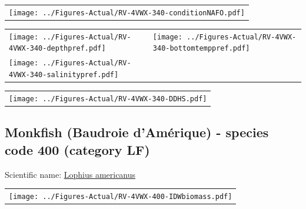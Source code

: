 \documentclass[12pt]{article}\usepackage[]{graphicx}\usepackage[]{color}
\begin{document}
\vspace{1cm}
\begin{minipage}{1.0\textwidth}
 \begin{tabular}{c}
\texttt{[image: ../Figures-Actual/RV-4VWX-340-conditionNAFO.pdf]} \\ 
\end{tabular} 
\end{minipage}
\clearpage
\begin{minipage}{1.0\textwidth}
 \begin{tabular}[t]{m{3in}m{3in}}
\texttt{[image: ../Figures-Actual/RV-4VWX-340-depthpref.pdf]} & 
\texttt{[image: ../Figures-Actual/RV-4VWX-340-bottomtemppref.pdf]} \\ 
\texttt{[image: ../Figures-Actual/RV-4VWX-340-salinitypref.pdf]} & 
 \\ 
\end{tabular} 
\end{minipage}
\newline

\vspace{1cm}
\begin{minipage}{1.0\textwidth}
 \begin{tabular}{c}
\texttt{[image: ../Figures-Actual/RV-4VWX-340-DDHS.pdf]} \\ 
\end{tabular} 
\end{minipage}
\clearpage

\renewcommand\thefigure{\thesubsection\Alph{figure}}

\setcounter{figure}{0}

\hypertarget{sec:400}{%
\subsection{Monkfish (Baudroie d'Amérique) - species code 400 (category LF)}\label{sec:400}}

  


Scientific name: \href{http://www.marinespecies.org/aphia.php?p=taxdetails\&id=159184}{Lophius americanus} \newline
\begin{minipage}{1.0\textwidth}
 \begin{tabular}{c}
\texttt{[image: ../Figures-Actual/RV-4VWX-400-IDWbiomass.pdf]} \\ 
\end{tabular} 
\end{minipage}
\newline
\end{document}

